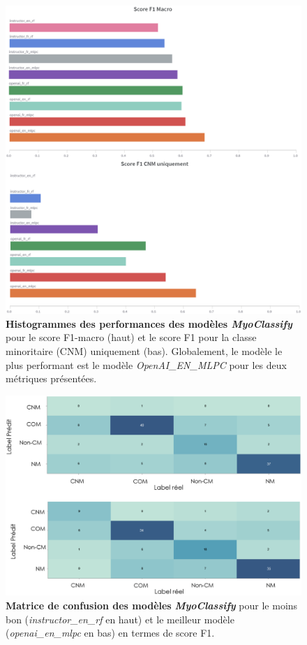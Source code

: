 \begin{figure}[!ht]
 \centering
 \includegraphics[width=1\textwidth]{figures/histo_myoclassify.png}
 \caption[Histogrammes des performances des modèle MyoClassify]{\textbf{Histogrammes des performances des modèles \textit{MyoClassify}} pour le score F1-macro (haut) et le score F1 pour la classe minoritaire (CNM) uniquement (bas). Globalement, le modèle le plus performant est le modèle \textit{OpenAI\_EN\_MLPC} pour les deux métriques présentées.}
 \label{fig:myoclassify_histo}
\end{figure}
\begin{figure}[!ht]
 \centering
 \includegraphics[width=1\textwidth]{figures/matrix_conf_myoclassify.png}
 \caption[Matrice de confusion \textit{MyoClassify}]{\textbf{Matrice de confusion des modèles} \textit{\textbf{MyoClassify}} pour le moins bon (\textit{instructor\_en\_rf} en haut) et le meilleur modèle (\textit{openai\_en\_mlpc} en bas) en termes de score F1.}
 \label{fig:myoclassify_conf}
\end{figure}

